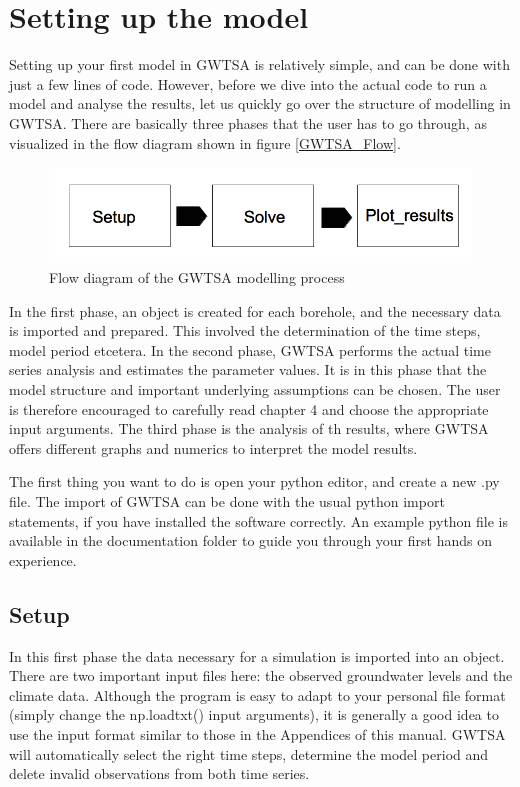 \chapter{Setting up the model}
Setting up your first model in GWTSA is relatively simple, and can be done with just a few lines of code. However, before we dive into the actual code to run a model and analyse the results, let us quickly go over the structure of modelling in GWTSA. There are basically three phases that the user has to go through, as visualized in the flow diagram shown in figure \ref{GWTSA_Flow}. 

\begin{figure}[h]
\label{GWTSA_Flow}
\centering
\includegraphics[width=1\linewidth]{Figures/GWTSA_Flow}
\caption{Flow diagram of the GWTSA modelling process}
\label{fig:GWTSA_Flow}
\end{figure}

In the first phase, an object is created for each borehole, and the necessary data is imported and prepared. This involved the determination of the time steps, model period etcetera. In the second phase, GWTSA performs the actual time series analysis and estimates the parameter values. It is in this phase that the model structure and important underlying assumptions can be chosen. The user is therefore encouraged to carefully read chapter 4 and choose the appropriate input arguments. The third phase is the analysis of th results, where GWTSA offers different graphs and numerics to interpret the model results.  

The first thing you want to do is open your python editor, and create a new .py file. The import of GWTSA can be done with the usual python import statements, if you have installed the software correctly. An example python file is available in the documentation folder to guide you through your first hands on experience. 

\section{Setup}
In this first phase the data necessary for a simulation is imported into an object. There are two important input files here: the observed groundwater levels and the climate data. Although the program is easy to adapt to your personal file format (simply change the np.loadtxt() input arguments), it is generally a good idea to use the input format similar to those in the Appendices of this manual. GWTSA will automatically select the right time steps, determine the model period and delete invalid observations from both time series. 

